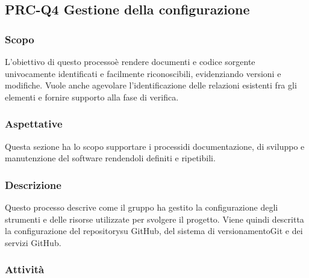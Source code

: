 \subsection{PRC-Q4 Gestione della configurazione}
	\subsubsection{Scopo}
		L'obiettivo di questo processo\glosp è rendere documenti e codice sorgente univocamente identificati e facilmente riconoscibili, evidenziando versioni e modifiche. Vuole anche agevolare l'identificazione delle relazioni esistenti fra gli elementi e fornire supporto alla fase di verifica.
	\subsubsection{Aspettative}
		Questa sezione ha lo scopo supportare i processi\glosp di documentazione, di sviluppo e manutenzione del software rendendoli definiti e ripetibili.  
	\subsubsection{Descrizione} 
		Questo processo descrive come il gruppo ha gestito la configurazione degli strumenti e delle risorse utilizzate per svolgere il progetto\glo.
		Viene quindi descritta la configurazione del repository\glosp su GitHub, del sistema di versionamento\glosp Git e dei servizi GitHub.
	\subsubsection{Attività}
